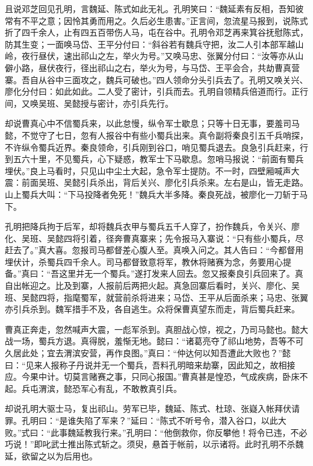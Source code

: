 且说邓芝回见孔明，言魏延、陈式如此无礼。孔明笑曰：“魏延素有反相，吾知彼常有不平之意；因怜其勇而用之。久后必生患害。”正言间，忽流星马报到，说陈式折了四千余人，止有四五百带伤人马，屯在谷中。孔明令邓芝再来箕谷抚慰陈式，防其生变；一面唤马岱、王平分付曰：“斜谷若有魏兵守把，汝二人引本部军越山岭，夜行昼伏，速出祁山之左，举火为号。”又唤马忠、张翼分付曰：“汝等亦从山僻小路，昼伏夜行，径出祁山之右，举火为号，与马岱、王平会合，共劫曹真营寨。吾自从谷中三面攻之，魏兵可破也。”四人领命分头引兵去了。孔明又唤关兴、廖化分付曰：如此如此。二人受了密计，引兵而去。孔明自领精兵倍道而行。正行间，又唤吴班、吴懿授与密计，亦引兵先行。

却说曹真心中不信蜀兵来，以此怠慢，纵令军士歇息；只等十日无事，要羞司马懿，不觉守了七日，忽有人报谷中有些小蜀兵出来。真令副将秦良引五千兵哨探，不许纵令蜀兵近界。秦良领命，引兵刚到谷口，哨见蜀兵退去。良急引兵赶来，行到五六十里，不见蜀兵，心下疑惑，教军士下马歇息。忽哨马报说：“前面有蜀兵埋伏。”良上马看时，只见山中尘土大起，急令军士提防。不一时，四壁厢喊声大震：前面吴班、吴懿引兵杀出，背后关兴、廖化引兵杀来。左右是山，皆无走路。山上蜀兵大叫：“下马投降者免死！”魏兵大半多降。秦良死战，被廖化一刀斩于马下。

孔明把降兵拘于后军，却将魏兵衣甲与蜀兵五千人穿了，扮作魏兵，令关兴、廖化、吴班、吴懿四将引着，径奔曹真寨来；先令报马入寨说：“只有些小蜀兵，尽赶去了。”真大喜。忽报司马都督差心腹人至。真唤入问之。其人告曰：“今都督用埋伏计，杀蜀兵四千余人。司马都督致意将军，教休将赌赛为念，务要用心提备。”真曰：“吾这里并无一个蜀兵。”遂打发来人回去。忽又报秦良引兵回来了。真自出帐迎之。比及到寨，人报前后两把火起。真急回寨后看时，关兴、廖化、吴班、吴懿四将，指麾蜀军，就营前杀将进来；马岱、王平从后面杀来；马忠、张翼亦引兵杀到。魏军措手不及，各自逃生。众将保曹真望东而走，背后蜀兵赶来。

曹真正奔走，忽然喊声大震，一彪军杀到。真胆战心惊，视之，乃司马懿也。懿大战一场，蜀兵方退。真得脱，羞惭无地。懿曰：“诸葛亮夺了祁山地势，吾等不可久居此处；宜去渭滨安营，再作良图。”真曰：“仲达何以知吾遭此大败也？”懿曰：“见来人报称子丹说并无一个蜀兵，吾料孔明暗来劫寨，因此知之，故相接应。今果中计。切莫言赌赛之事，只同心报国。”曹真甚是惶恐，气成疾病，卧床不起。兵屯渭滨，懿恐军心有乱，不敢教真引兵。

却说孔明大驱士马，复出祁山。劳军已毕，魏延、陈式、杜琼、张嶷入帐拜伏请罪。孔明曰：“是谁失陷了军来？”延曰：“陈式不听号令，潜入谷口，以此大败。”式曰：“此事魏延教我行来。”孔明曰：“他倒救你，你反攀他！将令已违，不必巧说！”即叱武士推出陈式斩之。须臾，悬首于帐前，以示诸将。此时孔明不杀魏延，欲留之以为后用也。

